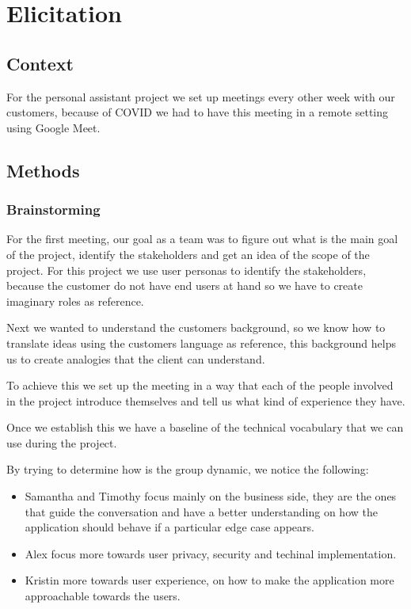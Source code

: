 \section{Elicitation}
\subsection{Context}
For the personal assistant project we set up meetings every other week with 
our customers, because of COVID we had to have this meeting in a remote 
setting using Google Meet.

\subsection{Methods}
\subsubsection{Brainstorming}
For the first meeting, our goal as a team was to figure out what is the main 
goal of the project, identify the stakeholders and get an idea of the scope of 
the project. For this project we use user personas \cite{user_personas} 
to identify the stakeholders, because the customer do not have end users at 
hand so we have to create imaginary roles as reference. \newline

\noindent Next we wanted to understand the customers background, so we know 
how to translate ideas using the customers language as reference, this 
background helps us to create analogies that the client can understand.

\noindent To achieve this we set up the meeting in a way that each of the 
people involved in the project introduce themselves and tell us what kind of 
experience they have. \newline

\noindent Once we establish this we have a baseline of the technical 
vocabulary that we can use during the project. \newline

\noindent By trying to determine how is the group dynamic, we notice the
following:
\begin{itemize}
    \item Samantha and Timothy focus mainly on the business side, they are 
    the ones that guide the conversation and have a better understanding 
    on how the application should behave if a particular edge case appears.
    \item Alex focus more towards user privacy, security and techinal 
    implementation.
    \item Kristin more towards user experience, on how to make the application 
    more approachable towards the users.
\end{itemize}

